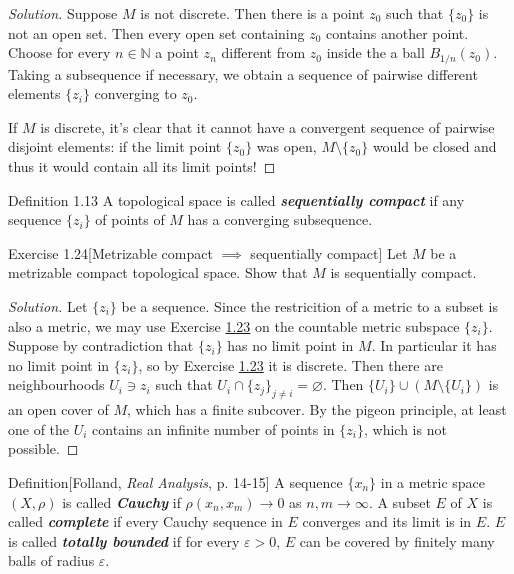 \begin{proof}[Solution]\leavevmode
Suppose $M$ is not discrete. Then there is a point $z_0$ such that $\{z_0\}$ is not an open set. Then every open set containing $z_0$ contains another point. Choose for every $n \in \mathbb{N}$ a point $z_n$ different from $z_0$ inside the a ball $B_{1/n}(z_0)$. Taking a subsequence if necessary, we obtain a sequence of pairwise different elements $\{z_i\}$ converging to $z_0$.

If $M$ is discrete, it's clear that it cannot have a convergent sequence of pairwise disjoint elements: if the limit point $\{z_0\}$ was open,  $M\setminus \{z_0\}$ would be closed and thus it would contain all its limit points!
\end{proof}

\begin{thing3}{Definition 1.13}\leavevmode
	A topological space is called \textit{\textbf{sequentially compact}} if any sequence $\{z_i\}$ of points of $M$ has a converging subsequence.
\end{thing3}

\begin{thing4}{Exercise 1.24}[Metrizable compact $\implies $ sequentially compact]\label{exer:1.24}\leavevmode
	Let $M$ be a metrizable compact topological space. Show that $M$ is sequentially compact.
\end{thing4}

\begin{proof}[Solution]\leavevmode
Let $\{z_i\}$ be a sequence. Since the restricition of a metric to a subset is also a metric, we may use Exercise \hyperref[exer:1.23]{1.23} on the countable metric subspace $\{z_i\}$. Suppose by contradiction that $\{z_i\}$ has no limit point in $M$. In particular it has no limit point in $\{z_i\}$, so by Exercise \hyperref[exer:1.23]{1.23} it is discrete. Then there are neighbourhoods $U_i \ni z_i$ such that $U_i \cap\{z_j\}_{j \neq  i}=\varnothing$. Then $\{U_i\} \cup  (M\setminus \{U_i\})$ is an open cover of $M$, which has a finite subcover. By the pigeon principle, at least one of the $U_i$ contains an infinite number of points in $\{z_i\}$, which is not possible.
\end{proof}

\begin{thing3}{Definition}[Folland, \textit{Real Analysis}, p. 14-15] \leavevmode
	A sequence $\{x_n\}$ in a metric space $(X,\rho)$ is called \textit{\textbf{Cauchy}} if $\rho(x_n,x_m)\to 0$ as $n,m \to \infty$. A subset $E$ of $X$ is called \textit{\textbf{complete}} if every Cauchy sequence in $E$ converges and its limit is in $E$. $E$ is called \textit{\textbf{totally bounded}} if for every $\varepsilon>0$, $E$ can be covered by finitely many balls of radius $\varepsilon$.
\end{thing3}

